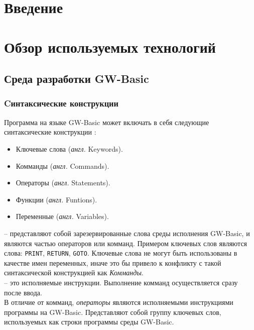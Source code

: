 \documentclass[12pt]{article}
\begin{document}
	\section{Введение}
	\newpage
	\section{Обзор используемых технологий}	
		\subsection{Среда разработки GW-Basic}
			
			
			\subsubsection{Cинтаксические конструкции}
			\hspace{\parindent} Программа на языке GW-Basic может включать в себя следующие синтаксические конструкции \cite{basicManual}:
			\begin{itemize}
				\item Ключевые слова ({\it англ.} Keywords).
				\item Комманды ({\it англ.} Commands).
				\item Операторы ({\it англ.} Statements).
				\item Функции ({\it англ.} Funtions).
				\item Переменные ({\it англ.} Variables).
			\end{itemize}
			
			 -- представляют собой зарезервированные слова среды исполнения GW-Basic, и являются частью операторов или комманд. Примером ключевых слов являются слова: {\tt PRINT}, {\tt RETURN}, {\tt GOTO}. Ключевые слова не могут быть использованы в качестве имен переменных, иначе это бы привело к конфликту с такой синтаксической конструкцией как {\it Комманды}. \\
			 -- это исполняемые инструкции. Выполнение комманд осуществляется сразу после ввода. \\
			\indent В отличие от комманд, {\it операторы} являются исполняемыми инструкциями программы на GW-Basic. Представляют собой группу ключевых слов, используемых как строки программы среды GW-Basic.
\end{document}
